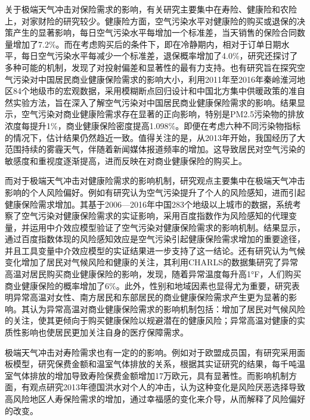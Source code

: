关于极端天气冲击对保险需求的影响，有关研究主要集中在寿险、健康险和农险上，对家财险的研究较少。健康险方面，空气污染水平对健康险的购买或退保的决策产生的显著影响\citep{2018Something}，每日空气污染水平每增加一个标准差，当天销售的保险合同数量增加了7.2\%。而在考虑购买后的条件下，即在冷静期内，相对于订单日期水平，每日空气污染水平每减少一个标准差，退保概率增加了4.0\%，研究还探讨了多种可能的机制，发现了对投射偏差和显著性的最有力支持。也有研究旨在探究空气污染对中国居民商业健康保险需求的影响大小\citep{赵强2021空气污染对商业健康保险需求的影响}，利用2011年至2016年秦岭淮河地区84个地级市的宏观数据，采用模糊断点回归设计和中国北方集中供暖政策的准自然实验方法，旨在深入了解空气污染对中国居民商业健康保险需求的影响。结果显示，空气污染对商业健康险需求存在显著的正向影响，特别是PM2.5污染物的排放浓度每提升1\%，商业健康保险密度提高1.098\%。即便在考虑六种不同污染物指标的情况下，估计结果仍然趋近一致。值得关注的是，从2013年开始，我国经历了大范围持续的雾霾天气，伴随着新闻媒体报道频率的增加。这导致居民对空气污染的敏感度和重视度逐渐提高，进而反映在对商业健康保险的购买上。

而对于极端天气冲击对健康险需求的影响机制，研究观点主要集中在极端天气冲击影响的个人风险偏好。例如有研究认为空气污染提升了个人的风险感知，进而引起健康保险需求增加\citep{宋平凡2022空气污染}。其基于2006—2016年中国283个地级以上城市的数据，系统考察了空气污染对健康保险需求的实证影响，采用百度指数作为风险感知的代理变量，并运用中介效应模型验证了空气污染对健康保险需求的影响机制。结果显示，通过百度指数体现的风险感知效应是空气污染引起健康保险需求增加的重要途径，并且工具变量中介效应模型的实证结果进一步支持了这一结论。还有研究认为气候变化增加了居民对气候风险和健康的关注\cite{zhong2022exposure}，其利用CHARLS的数据集研究了异常高温对居民购买商业健康保险的影响，发现，随着异常温度每升高1°F，人们购买商业健康保险的概率增加了6\%。此外，性别和地域因素也显得尤为重要，研究表明异常高温对女性、南方居民和东部居民的商业健康保险需求产生更为显著的影响。其认为异常高温对商业健康保险需求的影响机制包括：增加了居民对气候风险的关注，使其更倾向于购买健康保险以规避潜在的健康风险；异常高温对健康的实质性影响也使居民更加关注自身的医疗保障需求。

极端天气冲击对寿险需求也有一定的的影响。例如对于欧盟成员国，有研究采用面板模型，研究保费金额和温室气体排放的关系\citep{melnychenko2021influence}，根据其实证研究的结果，每千吨温室气体排放的增加导致寿险保费金额增加17万欧元，具有显著性。而影响机制方面，有观点研究2013年德国洪水对个人的冲击\citep{avdeenko2021impact}，认为这种变化是风险厌恶选择导致高风险地区人寿保险需求的增加，通过幸福感的变化来介导，从而解释了风险偏好的改变。

